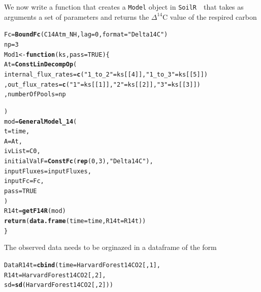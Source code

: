 \documentclass[a4paper]{article}\usepackage[]{graphicx}\usepackage[]{color}
\makeatletter
\newcommand{\hlnum}[1]{\textcolor[rgb]{0.686,0.059,0.569}{#1}}%
\newcommand{\hlstr}[1]{\textcolor[rgb]{0.192,0.494,0.8}{#1}}%
\newcommand{\hlstd}[1]{\textcolor[rgb]{0.345,0.345,0.345}{#1}}%
\newcommand{\hlkwa}[1]{\textcolor[rgb]{0.161,0.373,0.58}{\textbf{#1}}}%
\newcommand{\hlkwb}[1]{\textcolor[rgb]{0.69,0.353,0.396}{#1}}%
\newcommand{\hlkwc}[1]{\textcolor[rgb]{0.333,0.667,0.333}{#1}}%
\newcommand{\hlkwd}[1]{\textcolor[rgb]{0.737,0.353,0.396}{\textbf{#1}}}%
\newenvironment{kframe}{%
 \def\at@end@of@kframe{}%
 \ifinner\ifhmode%
  \def\at@end@of@kframe{\end{minipage}}%
  \begin{minipage}{\columnwidth}%
 \fi\fi%
 \def\FrameCommand##1{\hskip\@totalleftmargin \hskip-\fboxsep
 \colorbox{shadecolor}{##1}\hskip-\fboxsep
     \hskip-\linewidth \hskip-\@totalleftmargin \hskip\columnwidth}%
 \MakeFramed {\advance\hsize-\width
   \@totalleftmargin\z@ \linewidth\hsize
   \@setminipage}}%
 {\par\unskip\endMakeFramed%
 \at@end@of@kframe}
\newenvironment{knitrout}{}{} %
\newcommand{\SoilR}{\texttt{SoilR }}
\makeatother
\begin{document}
We now write a function that creates a {\tt Model} object in \SoilR \, that takes as arguments a set of parameters and returns the 
$\Delta^{14}$C value of the respired carbon

\begin{knitrout}
\color{fgcolor}\begin{kframe}
\begin{alltt}
\hlstd{Fc}\hlkwb{=}\hlkwd{BoundFc}\hlstd{(C14Atm_NH,}\hlkwc{lag}\hlstd{=}\hlnum{0}\hlstd{,}\hlkwc{format}\hlstd{=}\hlstr{"Delta14C"}\hlstd{)}
\hlstd{np}\hlkwb{=}\hlnum{3}
\hlstd{Mod1}\hlkwb{<-}\hlkwa{function}\hlstd{(}\hlkwc{ks}\hlstd{,}\hlkwc{pass}\hlstd{=}\hlnum{TRUE}\hlstd{)\{}
  \hlstd{At}\hlkwb{=}\hlkwd{ConstLinDecompOp}\hlstd{(}
       \hlkwc{internal_flux_rates}\hlstd{=}\hlkwd{c}\hlstd{(}\hlstr{"1_to_2"}\hlstd{=ks[[}\hlnum{4}\hlstd{]],}\hlstr{"1_to_3"}\hlstd{=ks[[}\hlnum{5}\hlstd{]])}
      \hlstd{,}\hlkwc{out_flux_rates}\hlstd{=}\hlkwd{c}\hlstd{(}\hlstr{"1"}\hlstd{=ks[[}\hlnum{1}\hlstd{]],}\hlstr{"2"}\hlstd{=ks[[}\hlnum{2}\hlstd{]],}\hlstr{"3"}\hlstd{=ks[[}\hlnum{3}\hlstd{]])}
      \hlstd{,}\hlkwc{numberOfPools} \hlstd{= np}

  \hlstd{)}
  \hlstd{mod}\hlkwb{=}\hlkwd{GeneralModel_14}\hlstd{(}
        \hlkwc{t}\hlstd{=time,}
        \hlkwc{A}\hlstd{=At,}
        \hlkwc{ivList}\hlstd{=C0,}
        \hlkwc{initialValF}\hlstd{=}\hlkwd{ConstFc}\hlstd{(}\hlkwd{rep}\hlstd{(}\hlnum{0}\hlstd{,}\hlnum{3}\hlstd{),}\hlstr{"Delta14C"}\hlstd{),}
        \hlkwc{inputFluxes}\hlstd{=inputFluxes,}
        \hlkwc{inputFc}\hlstd{=Fc,}
        \hlkwc{pass}\hlstd{=}\hlnum{TRUE}
  \hlstd{)}
  \hlstd{R14t}\hlkwb{=}\hlkwd{getF14R}\hlstd{(mod)}
  \hlkwd{return}\hlstd{(}\hlkwd{data.frame}\hlstd{(}\hlkwc{time}\hlstd{=time,}\hlkwc{R14t}\hlstd{=R14t))}
\hlstd{\}}
\end{alltt}
\end{kframe}
\end{knitrout}

The observed data needs to be orginazed in a dataframe of the form
\begin{knitrout}
\color{fgcolor}\begin{kframe}
\begin{alltt}
\hlstd{DataR14t}\hlkwb{=}\hlkwd{cbind}\hlstd{(}\hlkwc{time}\hlstd{=HarvardForest14CO2[,}\hlnum{1}\hlstd{],}
               \hlkwc{R14t}\hlstd{=HarvardForest14CO2[,}\hlnum{2}\hlstd{],}
               \hlkwc{sd}\hlstd{=}\hlkwd{sd}\hlstd{(HarvardForest14CO2[,}\hlnum{2}\hlstd{]))}
\end{alltt}
\end{kframe}
\end{knitrout}
\end{document}
